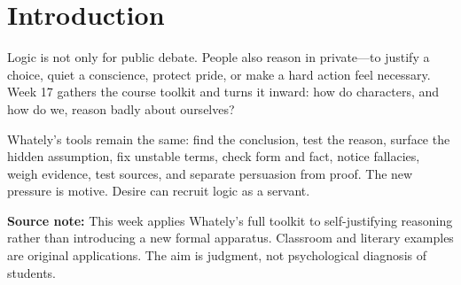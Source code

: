 \documentclass[12pt]{article}
\newcommand{\focusbox}[1]{\par\vspace{0.4em}\noindent\begingroup\setlength{\fboxsep}{6pt}\colorbox{gray!12}{\begin{minipage}{\dimexpr\linewidth-2\fboxsep\relax}#1\end{minipage}}\endgroup\par\vspace{0.5em}}
\begin{document}
\section*{Introduction}
Logic is not only for public debate. People also reason in private---to justify a choice, quiet a conscience, protect pride, or make a hard action feel necessary. Week 17 gathers the course toolkit and turns it inward: how do characters, and how do we, reason badly about ourselves?

Whately's tools remain the same: find the conclusion, test the reason, surface the hidden assumption, fix unstable terms, check form and fact, notice fallacies, weigh evidence, test sources, and separate persuasion from proof. The new pressure is motive. Desire can recruit logic as a servant.

\focusbox{\textbf{Source note:} This week applies Whately's full toolkit to self-justifying reasoning rather than introducing a new formal apparatus. Classroom and literary examples are original applications. The aim is judgment, not psychological diagnosis of students.}
\end{document}
